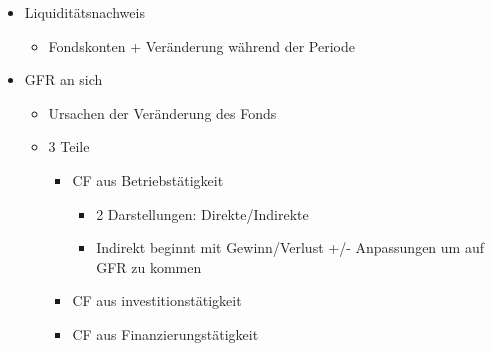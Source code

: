 \begin{itemize}
    \item Liquiditätsnachweis
    \begin{itemize}
        \item Fondskonten + Veränderung während der Periode
    \end{itemize}
    \item GFR an sich 
    \begin{itemize}
        \item Ursachen der Veränderung des Fonds 
        \item 3 Teile
        \begin{itemize}
            \item CF aus Betriebstätigkeit
            \begin{itemize}
                \item 2 Darstellungen: Direkte/Indirekte
                \item Indirekt beginnt mit Gewinn/Verlust +/-
                Anpassungen um auf GFR zu kommen
            \end{itemize}
            \item CF aus investitionstätigkeit
            \item CF aus Finanzierungstätigkeit
        \end{itemize}
    \end{itemize}
\end{itemize}